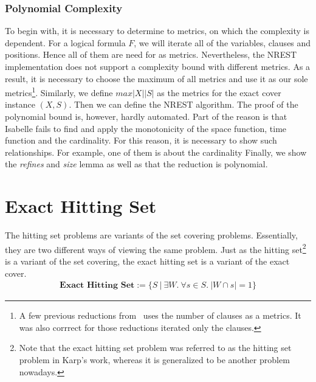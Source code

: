 \subsubsection{Polynomial Complexity}
To begin with, it is necessary to determine to metrics, on which the complexity is dependent. For 
a logical formula $F$, we will iterate all of the variables, clauses and positions. Hence all of them are need for as metrics. 
Nevertheless, the NREST implementation does not support a complexity bound with different metrics. As a result, it is necessary to 
choose the maximum of all metrics and use it as our sole metrics\footnote{A few previous reductions from \SAT\ uses the number of clauses 
as a metrics. It was also corrrect for those reductions iterated only the clauses.}. Similarly, we define $max |X| |S|$ as the metrics 
for the exact cover instance $(X, S)$. Then we can define the NREST algorithm.
The proof of the polynomial bound is, however, hardly automated. Part of the reason is that Isabelle fails to find and apply the monotonicity 
of the space function, time function and the cardinality. For this reason, it is necessary to show such relationships. For example, one of them is about the 
cardinality
Finally, we show the \textit{refines} and \textit{size} lemma as well as that the reduction is polynomial.

\section{Exact Hitting Set}
The hitting set problems are variants of the set covering problems. Essentially, they are two different ways 
of viewing the same problem. Just as the hitting set\footnote{Note that the exact hitting set problem was referred to as the hitting set problem in Karp's work, whereas 
it is generalized to be another problem nowadays.} is a variant of the set covering, the exact hitting set is 
a variant of the exact cover. 
\begin{align*}
   \textbf{Exact Hitting Set} := \{S\ |\ \exists W.\ \forall s \in S.\ |W \cap s| = 1\}
\end{align*}
 

